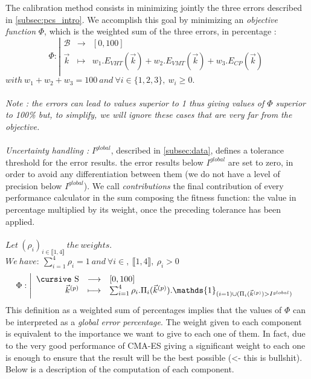 The calibration method consists in minimizing jointly the three errors described in \ref{subsec:pcs_intro}. We accomplish this goal by minimizing an \emph{objective function} $\Phi$, which is the weighted sum of the three errors, in percentage :
	\begin{displaymath}
		\Phi:
		\left|
  		\begin{array}{rcl}
    	\mathscr{B} & \longrightarrow &[0,100] \\
    	\vec{k} & \longmapsto & w_{1}.E_{VHT}(\vec{k})+w_{2}.E_{VMT}(\vec{k})+w_{3}.E_{CP}(\vec{k}) \\
  	\end{array}
	\right.
	\end{displaymath}
$with\ w_{1}+w_{2}+w_{3}=100\ and\ \forall i\in \{1,2,3\},\ w_{i}\geq 0.$\\
\\
\emph{Note : the errors can lead to values superior to 1 thus giving values of $\Phi$ superior to 100\% but, to simplify, we will ignore these cases that are very far from the objective.}\\
\\
\emph{Uncertainty handling :} $I^{global}$, described in \ref{subsec:data}, defines a tolerance threshold for the error results. the error results below $I^{global}$ are set to zero, in order to avoid any differentiation between them (we do not have a level of precision below $I^{global}$).
We call \emph{contributions} the final contribution of every performance calculator in the sum composing the fitness function: the value in percentage multiplied by its weight, once the preceding tolerance has been applied.\\
\\ 
$Let\ (\rho_{i})_{i\in\llbracket 1,4 \rrbracket}\ the\ weights.$\\
$We\ have:\ \sum_{i=1}^{4} \rho_{i}=1\ and\ \forall i \in,\ \llbracket 1,4 \rrbracket,\ \rho_{i}>0$\\
\begin{displaymath}
		\Phi:
		\left|
  		\begin{array}{rcl}
    	\text{\cursive S} & \longrightarrow &[0,100] \\
    	\vec{k}^{(p)} & \longmapsto & \sum_{i=1}^{4}\rho_{i}.\Pi_{i}(\vec{k}^{(p)}).\mathds{1}_{(i=1)\cup(\Pi_{i}(\vec{k}^{(p)})>I^{global})}\\ 
  		\end{array}
		\right.\\
\end{displaymath}
This definition as a weighted sum of percentages implies that the values of $\Phi$ can be interpreted as a \emph{global error percentage}. The weight given to each component is equivalent to the importance we want to give to each one of them. In fact, due to the very good performance of CMA-ES giving a significant weight to each one is enough to ensure that the result will be the best possible \color{red}(<- this is bullshit)\color{black}.\\
Below is a description of the computation of each component.
